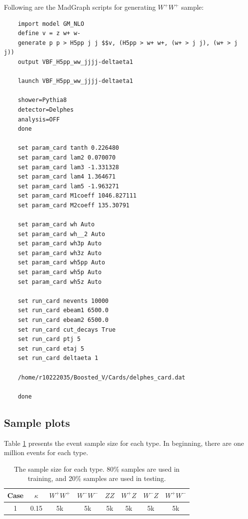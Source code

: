 \documentclass[12pt]{article}
\begin{document}
	Following are the MadGraph scripts for generating $W^{+}W^{+}$ sample:
	\begin{verbatim}
	import model GM_NLO
	define v = z w+ w-
	generate p p > H5pp j j $$v, (H5pp > w+ w+, (w+ > j j), (w+ > j j))
	output VBF_H5pp_ww_jjjj-deltaeta1

	launch VBF_H5pp_ww_jjjj-deltaeta1

	shower=Pythia8
	detector=Delphes
	analysis=OFF
	done

	set param_card tanth 0.226480
	set param_card lam2 0.070070
	set param_card lam3 -1.331328
	set param_card lam4 1.364671
	set param_card lam5 -1.963271
	set param_card M1coeff 1046.827111
	set param_card M2coeff 135.30791

	set param_card wh Auto
	set param_card wh__2 Auto
	set param_card wh3p Auto
	set param_card wh3z Auto
	set param_card wh5pp Auto
	set param_card wh5p Auto
	set param_card wh5z Auto

	set run_card nevents 10000
	set run_card ebeam1 6500.0
	set run_card ebeam2 6500.0
	set run_card cut_decays True
	set run_card ptj 5
	set run_card etaj 5
	set run_card deltaeta 1

	/home/r10222035/Boosted_V/Cards/delphes_card.dat

	done
	\end{verbatim}
	\subsection{Sample plots}%
	\label{sub:sample_plots}
		Table \ref{tab:full_event_sample_size_deltaeta1} presents the event sample size for each type. In beginning, there are one million events for each type.
		\begin{table}[htpb]
			\centering
			\caption{The sample size for each type. 80\% samples are used in training, and 20\% samples are used in testing.}
			\label{tab:full_event_sample_size_deltaeta1}
			\begin{tabular}{c|c|c|c|c|c|c|c}
			Case & $\kappa$ & $W^+W^+$ & $W^-W^-$ & $ZZ$ & $W^+Z$ & $W^-Z$ & $W^+W^-$ \\ \hline
			1    & 0.15     & 5k      & 5k      & 5k  & 5k    & 5k    & 5k      
			\end{tabular}
		\end{table}
\end{document}

